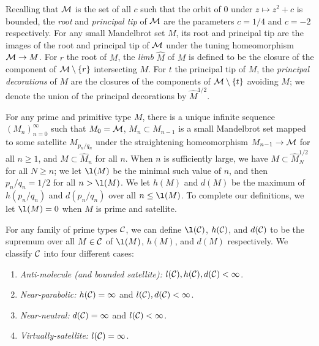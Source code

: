 \documentclass[12pt]{amsart}
\begin{document}
Recalling that $\mathcal M$  is the set of all $c$ such that the orbit of $0$ under $z\mapsto z^2+c$ is bounded, the \textit{root} and \textit{principal tip} of $\mathcal M$ are the parameters $c = 1/4$ and $c= -2$ respectively. For any small Mandelbrot set $M$, its root and principal tip are the images of the root and principal tip of $\mathcal M$ under the tuning homeomorphism $\mathcal M\to M$. 
For $r$ the root of $M$,  the \textit{limb} $\hat M$ of $M$ is defined to be the {closure of the} component of $\mathcal M\setminus \{r\}$ intersecting $M$. For $t$ the principal tip of $M$, the \textit{principal decorations} of $M$ are the {closures of the} components of $\mathcal M\setminus \{t\}$ avoiding $M$; we denote the union of the principal decorations by $\hat M^{1/2}$. 

For any prime and primitive type $M$, there is a unique infinite sequence $(M_n)_{n=0}^\infty$ such that $M_0 = \mathcal M$, $M_n\subset M_{n-1}$ is a small Mandelbrot set mapped to some satellite $M_{p_n/q_n}$ under the straightening homeomorphism $M_{n-1}\to \mathcal M$ for all $n\geq 1$, and $M\subset \hat M_n$ for all $n$.
When $n$ is sufficiently large, we  have $M\subset \hat M^{1/2}_N$ for all $N\geq n$;
we let $\l(M)$ be the minimal such value of $n$,
and then $p_n/q_n = 1/2$ for all $n > \l(M)$.
We let $h(M)$ and $d(M)$ be the maximum of $h(p_n/q_n)$ and $d(p_n/q_n)$ over all $n \le \l(M)$. 
To complete our definitions, we let $\l(M) = 0$ when $M$ is prime and satellite.

For any family of prime types $\mathcal C$, we can define
$\l(\CC)$, $h(\mathcal C)$, and $d(\mathcal C)$ to be the supremum over all $M\in \mathcal C$ of $\l(M)$,  $h(M)$, and $d(M)$ respectively.
We classify $\mathcal C$ into four different cases:
\begin{enumerate}
	 \item \textit{Anti-molecule (and bounded satellite):} $l(\mathcal C), h(\mathcal C), d(\mathcal C) < \infty$.
	\item \textit{Near-parabolic:} $h(\mathcal C)= \infty$ and $l(\mathcal C), d(\mathcal C) < \infty$.
	\item \textit{Near-neutral:} $d(\mathcal C) = \infty$ and $l(\mathcal C) < \infty$.%
	\item \textit{Virtually-satellite:} $l(\mathcal C) = \infty$.%
\end{enumerate}
\end{document}
